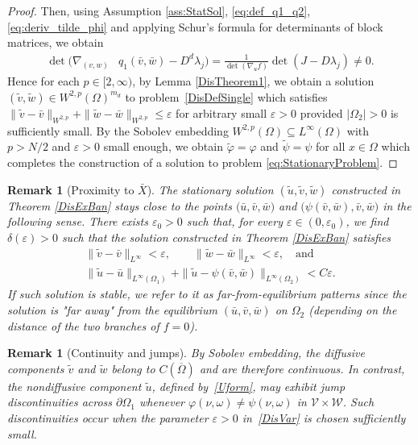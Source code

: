 \documentclass[12pt, a4paper]{amsart}
\numberwithin{equation}{section}
\newcommand{\CSS}{\bar{X}}
\newcommand{\Cun}{\bar{\un}}
\newcommand{\Cus}{\bar{\us}}
\newcommand{\Cuf}{\bar{\uf}}
\newcommand{\Nun}{\tilde{\un}}
\newcommand{\Nus}{\tilde{\us}}
\newcommand{\Nuf}{\tilde{\uf}}
\newcommand{\un}{u}
\newcommand{\us}{v}
\newcommand{\uf}{w}
\newcommand{\md}{m_{d}}  %
\newenvironment{nalign}
{\begin{equation}\begin{aligned}}
		{\end{aligned}\end{equation}\ignorespacesafterend}
\newtheorem{remark}[theorem]{\bf Remark}
\begin{document}
\begin{proof}
    Then, using {Assumption \ref{ass:StatSol}}, \eqref{eq:def_q1_q2}, \eqref{eq:deriv_tilde_phi} and applying Schur's formula for determinants of block matrices, we obtain
        \begin{nalign}
		\det \big(\nabla_{(\us,\uf)} & q_1(\Cus, \Cuf) - D^d\lambda_j\big) =        
        \frac{1}{\det\left(\nabla_u f\right)}\det\left(J - D\lambda_j\right)\neq 0.
	\end{nalign}    
	Hence for each $p\in[2,\infty)$, by Lemma \ref{DisTheorem1}, we obtain a solution $(\Nus,\Nuf)\in W^{2,p}(\Omega)^{\md}$ to problem~\eqref{DisDefSingle} which satisfies $\| \Nus-\Cus\|_{W^{2,p}} + \| \Nuf-\Cuf\|_{W^{2,p}} \leqslant \varepsilon$ for arbitrary small $\varepsilon>0$ provided $|\Omega_2|>0$ is sufficiently small. By the Sobolev embedding $W^{2,p}(\Omega) \subseteq L^\infty(\Omega)$ with $p>N/2$ 
	and $\varepsilon >0$ small enough, we obtain $\tilde{\varphi} = \varphi$ and $\tilde{\psi} = \psi$ for all $x\in \Omega$ which completes the construction of a solution to problem \eqref{eq:StationaryProblem}.
\end{proof}


\begin{remark}[Proximity to $\CSS$]\label{rem:Jump_pattern_far_from_CSS}
    The stationary solution $(\Nun, \Nus,\Nuf)$ constructed in Theorem \ref{DisExBan} stays close to the points 
    $\big(\Cun, \Cus,\Cuf\big)$  and 
    $\big(\psi (\Cus,\Cuf), \Cus,\Cuf\big)$
    in the following sense.
    There exists $\varepsilon_0>0$ such that, for every $\varepsilon \in (0,\varepsilon_0)$, we find $\delta(\varepsilon)>0$ such that the solution constructed in Theorem \ref{DisExBan} satisfies
    \begin{gather}
        \label{DisVar}
        \|\Nus - \Cus \|_{L^\infty}  < \varepsilon, \qquad \|\Nuf - \Cuf \|_{L^\infty} < \varepsilon, \quad \text{and} \\ 
        \|\Nun -  \Cun \|_{L^\infty(\Omega_1)} + \|\Nun - \psi (\Cus, \Cuf) \|_{L^\infty(\Omega_2)}  < C\varepsilon.
    \end{gather}  
    If such solution is stable, we refer to it as \emph{far-from-equilibrium patterns} since the solution is "far away" from the equilibrium $(\Cun, \Cus, \Cuf)$ on $\Omega_2$ (depending on the distance of the two branches of $f=0$).
\end{remark}

\begin{remark}[Continuity and jumps]
\label{rem:Conti}
By Sobolev embedding, the diffusive components $\Nus$ and $\Nuf$ belong to $C(\overline{\Omega})$ and are therefore continuous.  
In contrast, the nondiffusive component $\Nun$, defined by~\eqref{Uform}, may exhibit jump discontinuities across $\partial\Omega_1$ whenever $\varphi(\nu,\omega) \neq \psi(\nu,\omega)$ in $\mathcal{V}\times\mathcal{W}$.  
Such discontinuities occur when the parameter $\varepsilon>0$ in~\eqref{DisVar} is chosen sufficiently small.
\end{remark}
\end{document}

